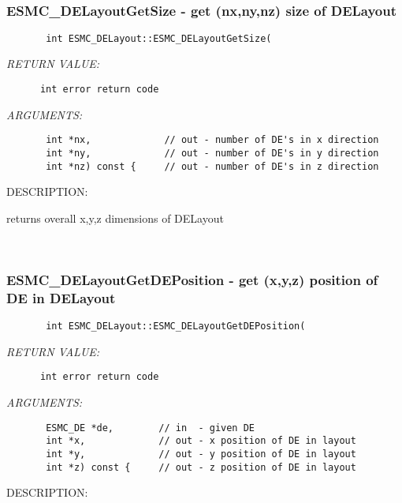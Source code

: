 
\mbox{}\hrulefill\ 
 
\subsubsection{ESMC\_DELayoutGetSize - get (nx,ny,nz) size of DELayout}


  
\begin{verbatim}       int ESMC_DELayout::ESMC_DELayoutGetSize(\end{verbatim}{\em RETURN VALUE:}
\begin{verbatim}      int error return code\end{verbatim}{\em ARGUMENTS:}
\begin{verbatim}       int *nx,             // out - number of DE's in x direction
       int *ny,             // out - number of DE's in y direction
       int *nz) const {     // out - number of DE's in z direction\end{verbatim}
{\sf DESCRIPTION:\\ }


      returns overall x,y,z dimensions of DELayout
   
 
\mbox{}\hrulefill\ 
 
\subsubsection{ESMC\_DELayoutGetDEPosition - get (x,y,z) position of DE in DELayout}


  
\begin{verbatim}       int ESMC_DELayout::ESMC_DELayoutGetDEPosition(\end{verbatim}{\em RETURN VALUE:}
\begin{verbatim}      int error return code\end{verbatim}{\em ARGUMENTS:}
\begin{verbatim}       ESMC_DE *de,        // in  - given DE
       int *x,             // out - x position of DE in layout
       int *y,             // out - y position of DE in layout
       int *z) const {     // out - z position of DE in layout\end{verbatim}
{\sf DESCRIPTION:\\ }



